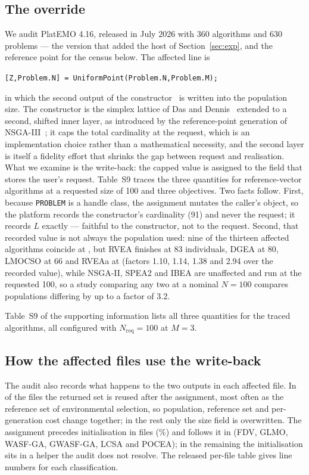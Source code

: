 \documentclass{SCIS2026}
\begin{document}
\subsection{The override}
We audit PlatEMO 4.16, released in July 2026 with 360 algorithms and 630 problems --- the version that added the host of Section~\ref{sec:exp}, and the reference point for the census below. The affected line is
\begin{center}
\texttt{[Z,Problem.N] = UniformPoint(Problem.N,Problem.M);}
\end{center}
in which the second output of the constructor~\cite{26} is written into the population size. The constructor is the simplex lattice of Das and Dennis~\cite{27} extended to a second, shifted inner layer, as introduced by the reference-point generation of NSGA-III~\cite{1}; it caps the total cardinality at the request, which is an implementation choice rather than a mathematical necessity, and the second layer is itself a fidelity effort that shrinks the gap between request and realisation. What we examine is the write-back: the capped value is assigned to the field that stores the user's request. Table~S9 traces the three quantities for \nTraced{} reference-vector algorithms at a requested size of 100 and three objectives. Two facts follow. First, because \texttt{PROBLEM} is a handle class, the assignment mutates the caller's object, so the platform records the constructor's cardinality (91) and never the request; it records $L$ exactly --- faithful to the constructor, not to the request. Second, that recorded value is not always the population used: nine of the thirteen affected algorithms coincide at \retMthree{}, but RVEA finishes at 83 individuals, DGEA at 80, LMOCSO at 66 and RVEAa at \nRealMin{} (factors 1.10, 1.14, 1.38 and 2.94 over the recorded value), while NSGA-II, SPEA2 and IBEA are unaffected and run at the requested 100, so a study comparing any two at a nominal $N=100$ compares populations differing by up to a factor of 3.2.

Table~S9 of the supporting information lists all three quantities for the traced algorithms, all configured with $N_{\mathrm{req}}=100$ at $M=3$.

\subsection{How the affected files use the write-back}
\label{sec:usage}
The audit also records what happens to the two outputs in each affected file. In \nLexReuseZ{} of the \nLexFiles{} files the returned set is reused after the assignment, most often as the reference set of environmental selection, so population, reference set and per-generation cost change together; in the rest only the size field is overwritten. The assignment precedes initialisation in \nLexBefore{} files (\pctLexBefore\%) and follows it in \nLexAfter{} (FDV, GLMO, WASF-GA, GWASF-GA, LCSA and POCEA); in the remaining \nLexNoInit{} the initialisation sits in a helper the audit does not resolve. The released per-file table gives line numbers for each classification.
\end{document}
